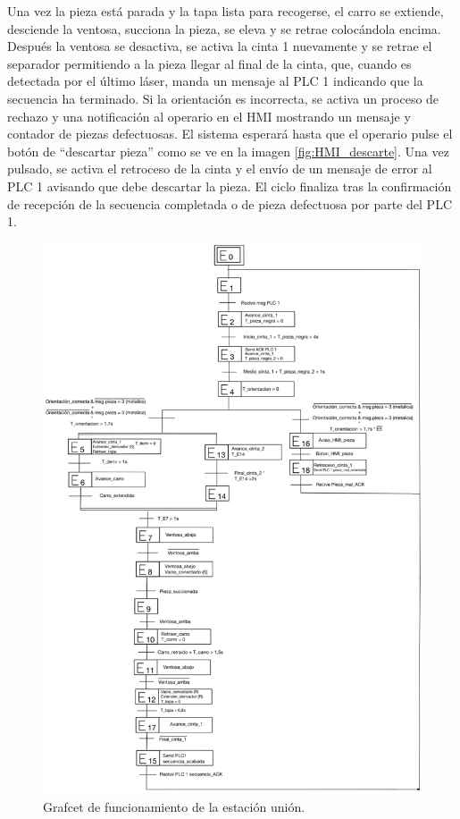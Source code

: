 Una vez la pieza está parada y la tapa lista para recogerse, el carro se extiende, desciende la ventosa, succiona la pieza, se eleva y se retrae colocándola encima. Después la ventosa se desactiva, se activa la cinta 1 nuevamente y se retrae el separador permitiendo a la pieza llegar al final de la cinta, que, cuando es detectada por el último láser, manda un mensaje al PLC 1 indicando que la secuencia ha terminado. Si la orientación es incorrecta, se activa un proceso de rechazo y una notificación al operario en el HMI mostrando un mensaje y contador de piezas defectuosas. El sistema esperará hasta que el operario pulse el botón de “descartar pieza” como se ve en la imagen \ref{fig:HMI_descarte}. Una vez pulsado, se activa el retroceso de la cinta y el envío de un mensaje de error al PLC 1 avisando que debe descartar la pieza. El ciclo finaliza tras la confirmación de recepción de la secuencia completada o de pieza defectuosa por parte del PLC 1.
 
 \begin{figure}[h!]
  \includegraphics[width=15cm]{figs/grafcet_union}
  \caption{\centering Grafcet de funcionamiento de la estación unión.}
  \label{fig:grafcet_union}
\end{figure}
\clearpage


